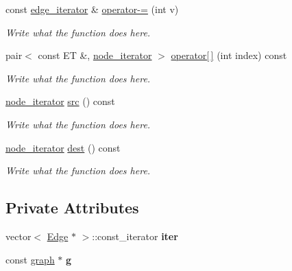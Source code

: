 \begin{DoxyCompactItemize}
const \hyperlink{classgraph_1_1edge__iterator}{edge\+\_\+iterator} \& \hyperlink{classgraph_1_1edge__iterator_aaf9399c6beae614ea25f0601b61717ad}{operator-\/=} (int v)
\begin{DoxyCompactList}\small\item\em Write what the function does here. \end{DoxyCompactList}\item 
pair$<$ const E\+T \&, \hyperlink{classgraph_1_1node__iterator}{node\+\_\+iterator} $>$ \hyperlink{classgraph_1_1edge__iterator_aa37f36f86c3e59102bc4d79ab9b91a53}{operator\mbox{[}$\,$\mbox{]}} (int index) const 
\begin{DoxyCompactList}\small\item\em Write what the function does here. \end{DoxyCompactList}\item 
\hyperlink{classgraph_1_1node__iterator}{node\+\_\+iterator} \hyperlink{classgraph_1_1edge__iterator_a98a66e524bdfc1279aba7f8e04c18d33}{src} () const 
\begin{DoxyCompactList}\small\item\em Write what the function does here. \end{DoxyCompactList}\item 
\hyperlink{classgraph_1_1node__iterator}{node\+\_\+iterator} \hyperlink{classgraph_1_1edge__iterator_a2c9de7b09212f35c31308dee010c507d}{dest} () const 
\begin{DoxyCompactList}\small\item\em Write what the function does here. \end{DoxyCompactList}\end{DoxyCompactItemize}
\subsection*{Private Attributes}
\begin{DoxyCompactItemize}
\item 
\hypertarget{classgraph_1_1edge__iterator_a1a0a3fa0e4cd5ed6bb1304683a4ed3b0}{vector$<$ \hyperlink{structgraph_1_1Edge}{Edge} $\ast$ $>$\+::const\+\_\+iterator {\bfseries iter}}\label{classgraph_1_1edge__iterator_a1a0a3fa0e4cd5ed6bb1304683a4ed3b0}

\item 
\hypertarget{classgraph_1_1edge__iterator_a4232246807cc9b097f9c5196cc1e4ae5}{const \hyperlink{classgraph}{graph} $\ast$ {\bfseries g}}\label{classgraph_1_1edge__iterator_a4232246807cc9b097f9c5196cc1e4ae5}

\end{DoxyCompactItemize}

